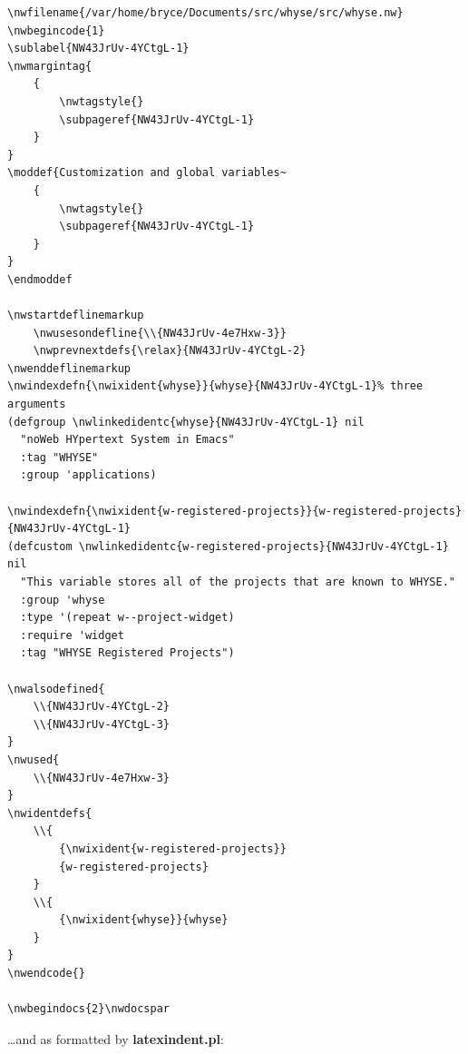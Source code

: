 \begin{verbatim}
\nwfilename{/var/home/bryce/Documents/src/whyse/src/whyse.nw}
\nwbegincode{1}
\sublabel{NW43JrUv-4YCtgL-1}
\nwmargintag{
    {
        \nwtagstyle{}
        \subpageref{NW43JrUv-4YCtgL-1}
    }
}
\moddef{Customization and global variables~
    {
        \nwtagstyle{}
        \subpageref{NW43JrUv-4YCtgL-1}
    }
}
\endmoddef

\nwstartdeflinemarkup
    \nwusesondefline{\\{NW43JrUv-4e7Hxw-3}}
    \nwprevnextdefs{\relax}{NW43JrUv-4YCtgL-2}
\nwenddeflinemarkup
\nwindexdefn{\nwixident{whyse}}{whyse}{NW43JrUv-4YCtgL-1}% three arguments
(defgroup \nwlinkedidentc{whyse}{NW43JrUv-4YCtgL-1} nil
  "noWeb HYpertext System in Emacs"
  :tag "WHYSE"
  :group 'applications)

\nwindexdefn{\nwixident{w-registered-projects}}{w-registered-projects}{NW43JrUv-4YCtgL-1}
(defcustom \nwlinkedidentc{w-registered-projects}{NW43JrUv-4YCtgL-1} nil
  "This variable stores all of the projects that are known to WHYSE."
  :group 'whyse
  :type '(repeat w--project-widget)
  :require 'widget
  :tag "WHYSE Registered Projects")

\nwalsodefined{
    \\{NW43JrUv-4YCtgL-2}
    \\{NW43JrUv-4YCtgL-3}
}
\nwused{
    \\{NW43JrUv-4e7Hxw-3}
}
\nwidentdefs{
    \\{
        {\nwixident{w-registered-projects}}
        {w-registered-projects}
    }
    \\{
        {\nwixident{whyse}}{whyse}
    }
}
\nwendcode{}

\nwbegindocs{2}\nwdocspar
\end{verbatim}

\ldots and as formatted by \textbf{latexindent.pl}:

